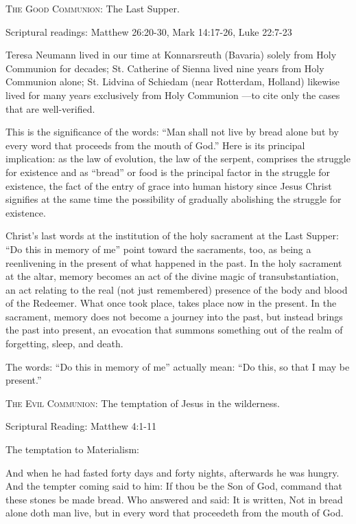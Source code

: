 \textsc{The Good Communion}: The Last Supper.

Scriptural readings: Matthew 26:20-30, Mark 14:17-26, Luke 22:7-23

\begin{quotationx}
Teresa Neumann lived in our time at Konnarsreuth (Bavaria) solely from Holy Communion for decades; St. Catherine of Sienna lived nine years from Holy Communion alone; St. Lidvina of Schiedam (near Rotterdam, Holland) likewise lived for many years exclusively from Holy Communion —to cite only the cases that are well-verified.

This is the significance of the words: ``Man shall not live by bread alone but by every word that proceeds from the mouth of God.'' Here is its principal implication: as the law of evolution, the law of the serpent, comprises the struggle for existence and as ``bread'' or food is the principal factor in the struggle for existence, the fact of the entry of grace into human history since Jesus Christ signifies at the same time the possibility of gradually abolishing the struggle for existence. 

\end{quotationx}
Christ's last words at the institution of the holy sacrament at the Last Supper: ``Do this in memory of me'' point toward the sacraments, too, as being a reenlivening in the present of what happened in the past. In the holy sacrament at the altar, memory becomes an act of the divine magic of transubstantiation, an act relating to the real (not just remembered) presence of the body and blood of the Redeemer. What once took place, takes place now in the present. In the sacrament, memory does not become a journey into the past, but instead brings the past into present, an evocation that summons something out of the realm of forgetting, sleep, and death.

\begin{quotex}
The words: ``Do this in memory of me'' actually mean: ``Do this, so that I may be present.'' 

\end{quotex}

\textsc{The Evil Communion:} The temptation of Jesus in the wilderness.

Scriptural Reading: Matthew 4:1-11

The temptation to Materialism:

\begin{quotex}
And when he had fasted forty days and forty nights, afterwards he was hungry. And the tempter coming said to him: If thou be the Son of God, command that these stones be made bread. Who answered and said: It is written, Not in bread alone doth man live, but in every word that proceedeth from the mouth of God. 
\end{quotex}

